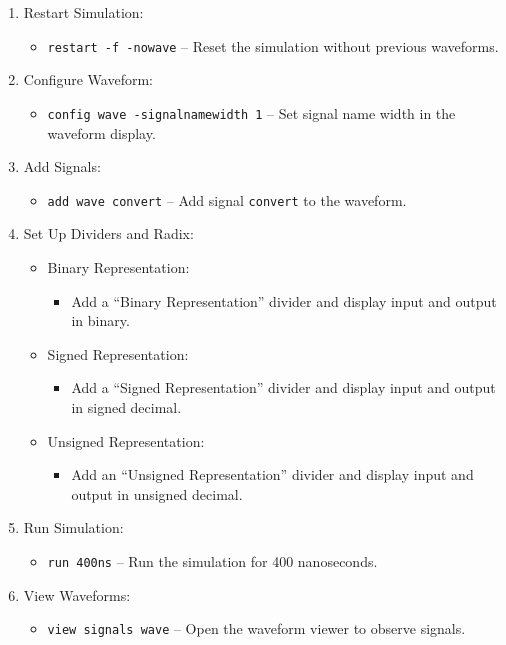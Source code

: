 \documentclass[12pt]{article}
\begin{document}
\begin{enumerate}
    \item Restart Simulation:
    \begin{itemize}
        \item \texttt{restart -f -nowave} – Reset the simulation without previous waveforms.
    \end{itemize}

    \item Configure Waveform:
    \begin{itemize}
        \item \texttt{config wave -signalnamewidth 1} – Set signal name width in the waveform display.
    \end{itemize}

    \item Add Signals:
    \begin{itemize}
        \item \texttt{add wave convert} – Add signal \texttt{convert} to the waveform.
    \end{itemize}

    \item Set Up Dividers and Radix:
    \begin{itemize}
        \item Binary Representation:
        \begin{itemize}
            \item Add a “Binary Representation” divider and display input and output in binary.
        \end{itemize}
        \item Signed Representation:
        \begin{itemize}
            \item Add a “Signed Representation” divider and display input and output in signed decimal.
        \end{itemize}
        \item Unsigned Representation:
        \begin{itemize}
            \item Add an “Unsigned Representation” divider and display input and output in unsigned decimal.
        \end{itemize}
    \end{itemize}

    \item Run Simulation:
    \begin{itemize}
        \item \texttt{run 400ns} – Run the simulation for 400 nanoseconds.
    \end{itemize}

    \item View Waveforms:
    \begin{itemize}
        \item \texttt{view signals wave} – Open the waveform viewer to observe signals.
    \end{itemize}
\end{enumerate}
\end{document}
